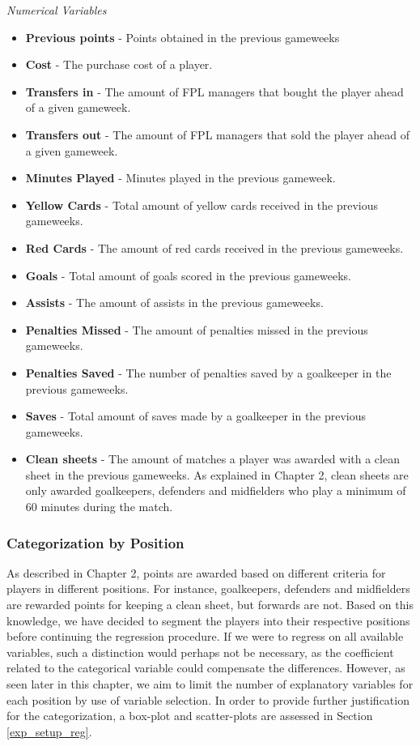 \textit{Numerical Variables}
\newpar
\begin{itemize}
    \item \textbf{Previous points} - Points obtained in the previous gameweeks
    \item \textbf{Cost} - The purchase cost of a player.
    \item \textbf{Transfers in} - The amount of FPL managers that bought the player ahead of a given gameweek.
    \item \textbf{Transfers out} - The amount of FPL managers that sold the player ahead of a given gameweek.
    \item \textbf{Minutes Played} - Minutes played in the previous gameweek.
    \item \textbf{Yellow Cards} - Total amount of yellow cards received in the previous gameweeks.
    \item \textbf{Red Cards} - The amount of red cards received in the previous gameweeks.
    \item \textbf{Goals} - Total amount of goals scored in the previous gameweeks.
    \item \textbf{Assists} - The amount of assists in the previous gameweeks.
    \item \textbf{Penalties Missed} - The amount of penalties missed in the previous gameweeks.
    \item \textbf{Penalties Saved} - The number of penalties saved by a goalkeeper in the previous gameweeks.
    \item \textbf{Saves} - Total amount of saves made by a goalkeeper in the previous gameweeks.
    \item \textbf{Clean sheets} - The amount of matches a player was awarded with a clean sheet in the previous gameweeks. As explained in Chapter 2, clean sheets are only awarded goalkeepers, defenders and midfielders who play a minimum of 60 minutes during the match.
    
\end{itemize}

\subsubsection{Categorization by Position}


As described in Chapter 2, points are awarded based on different criteria for players in different positions. For instance, goalkeepers, defenders and midfielders are rewarded points for keeping a clean sheet, but forwards are not. Based on this knowledge, we have decided to segment the players into their respective positions before continuing the regression procedure. If we were to regress on all available variables, such a distinction would perhaps not be necessary, as the coefficient related to the categorical variable could compensate the differences. However, as seen later in this chapter, we aim to limit the number of explanatory variables for each position by use of variable selection. In order to provide further justification for the categorization, a box-plot and scatter-plots are assessed in Section \ref{exp_setup_reg}.

